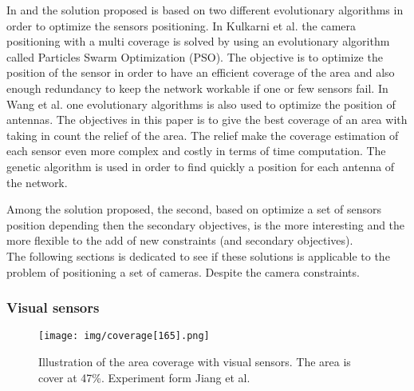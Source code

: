\begin{itemize}
In \cite{59*wang2008} and \cite{200*kulkarni2011} the solution proposed is based on two different evolutionary algorithms in order to optimize the sensors positioning. 
In Kulkarni et al. \cite{200*kulkarni2011} the camera positioning with a multi coverage is solved by using an evolutionary algorithm called Particles Swarm Optimization (PSO). The objective is to optimize the position of the sensor in order to have an efficient coverage of the area and also enough redundancy to keep the network workable if one or few sensors fail. In Wang et al. \cite{59*wang2008} one evolutionary algorithms is also used to optimize the position of antennas. The objectives in this paper is to give the best coverage of an area with taking in count the relief of the area. The relief make the coverage estimation of each sensor even more complex and costly in terms of time computation. The genetic algorithm is used in order to find quickly a position for each antenna of the network. 
\end{itemize}

Among the solution proposed, the second, based on optimize a set of sensors position  depending then  the secondary objectives, is the more interesting and the more flexible to the add of new constraints (and secondary objectives). \\
The following sections is dedicated to see if these solutions is applicable to the problem of positioning a set of cameras. Despite the camera constraints.

	\subsubsection{Visual sensors}
	
	\begin{figure}[t!]
	\center
{}
   \texttt{[image: img/coverage[165].png]}
  \caption{Illustration of  the  area coverage with visual sensors. The area  is cover at 47\%. Experiment form Jiang et al. \citep{165*jiang2010} }\label{fig:Coverage165}
  \endminipage\hfill
\end{figure}
	
